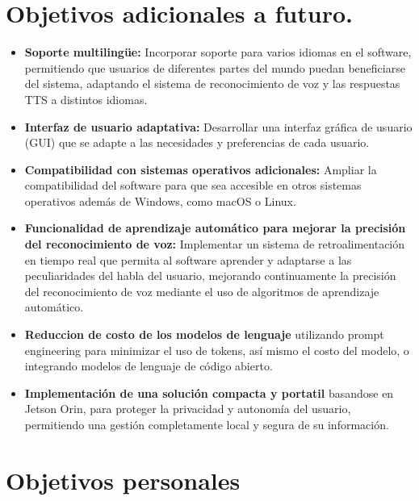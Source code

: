\section{Objetivos adicionales a futuro.}

\begin{itemize}
    \item \textbf{Soporte multilingüe:} Incorporar soporte para varios idiomas en el software, permitiendo que usuarios de diferentes partes del mundo puedan beneficiarse del sistema, adaptando el sistema de reconocimiento de voz y las respuestas TTS a distintos idiomas.
    
    \item \textbf{Interfaz de usuario adaptativa:} Desarrollar una interfaz gráfica de usuario (GUI) que se adapte a las necesidades y preferencias de cada usuario.
    
    \item \textbf{Compatibilidad con sistemas operativos adicionales:} Ampliar la compatibilidad del software para que sea accesible en otros sistemas operativos además de Windows, como macOS o Linux.
    
    \item \textbf{Funcionalidad de aprendizaje automático para mejorar la precisión del reconocimiento de voz:} Implementar un sistema de retroalimentación en tiempo real que permita al software aprender y adaptarse a las peculiaridades del habla del usuario, mejorando continuamente la precisión del reconocimiento de voz mediante el uso de algoritmos de aprendizaje automático.

    \item \textbf{Reduccion de costo de los modelos de lenguaje} utilizando prompt engineering para minimizar el uso de tokens, así mismo el costo del modelo, o integrando modelos de lenguaje de código abierto.

    \item \textbf{Implementación de una solución compacta y portatil} basandose en Jetson Orin, para proteger la privacidad y autonomía del usuario, permitiendo una gestión completamente local y segura de su información.
\end{itemize}


\section{Objetivos personales}

